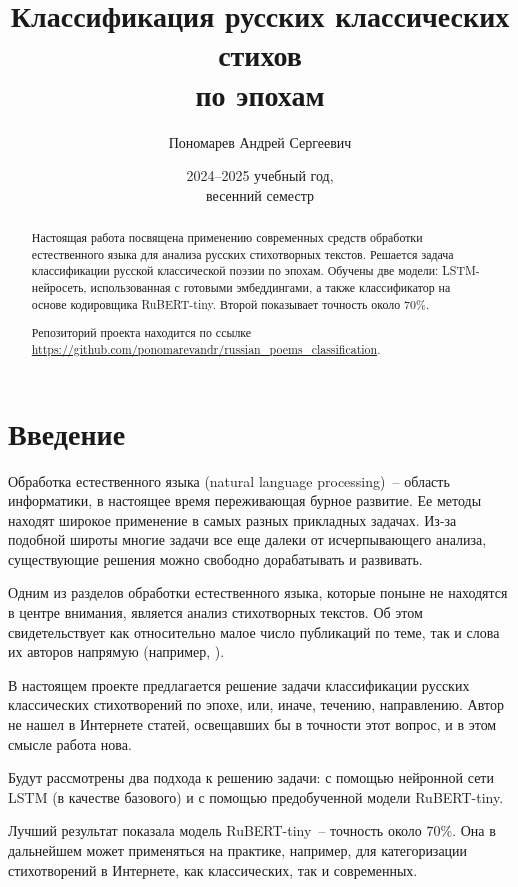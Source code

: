\documentclass[a4paper,12pt]{article}
\title{Классификация русских классических стихов \\ по эпохам}
\author{Пономарев Андрей Сергеевич}
\date{2024--2025 учебный год, \\ весенний семестр}
\begin{document}
\maketitle

\begin{abstract}
    Настоящая работа посвящена применению современных средств обработки естественного языка для анализа русских стихотворных текстов. Решается задача классификации русской классической поэзии по эпохам. Обучены две модели: LSTM-нейросеть, использованная с готовыми эмбеддингами, а также классификатор на основе кодировщика RuBERT-tiny. Второй показывает точность около $70 \%$.

    Репозиторий проекта находится по ссылке \\
    \url{https://github.com/ponomarevandr/russian_poems_classification}.
\end{abstract}



\section{Введение}

Обработка естественного языка (natural language processing)~-- область информатики, в настоящее время переживающая бурное развитие. Ее методы находят широкое применение в самых разных прикладных задачах. Из-за подобной широты многие задачи все еще далеки от исчерпывающего анализа, существующие решения можно свободно дорабатывать и развивать.

Одним из разделов обработки естественного языка, которые поныне не находятся в центре внимания, является анализ стихотворных текстов. Об этом свидетельствует как относительно малое число публикаций по теме, так и слова их авторов напрямую (например, \cite{barbado2021}).

В настоящем проекте предлагается решение задачи классификации русских классических стихотворений по эпохе, или, иначе, течению, направлению. Автор не нашел в Интернете статей, освещавших бы в точности этот вопрос, и в этом смысле работа нова.

Будут рассмотрены два подхода к решению задачи: с помощью нейронной сети LSTM (в качестве базового) и с помощью предобученной модели RuBERT-tiny.

Лучший результат показала модель RuBERT-tiny~-- точность около $70 \%$. Она в дальнейшем может применяться на практике, например, для категоризации стихотворений в Интернете, как классических, так и современных.
\end{document}
